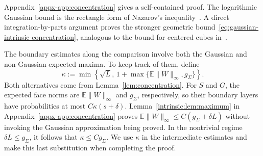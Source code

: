 \documentclass[11pt,letterpaper,twoside,leqno]{article}
\theoremstyle{bookplain}
\theoremstyle{bookremark}
\newcommand{\E}{\mathbb E}
\begin{document}
{
Appendix~\ref{appx-app:concentration} gives a self-contained proof.
The logarithmic Gaussian bound is the rectangle form of Nazarov's
inequality~\cite[Lemma~A.1]{CCK2017}. A direct integration-by-parts
argument proves the stronger geometric
bound~\eqref{eq:gaussian-intrinsic-concentration}, analogous to the
bound for centered cubes in~\cite[Theorem~3 and Comment~5]{CCK2015AC}.
}

{
The boundary estimates along the comparison involve both the Gaussian
and non-Gaussian expected maxima. To keep track of them, define
\begin{equation}\label{eq:intrinsic-boundary-coefficient}
 \kappa:=\min\left\{\sqrt L,\,
             1+\max\{\E\|W\|_\infty,g_\Sigma\}\right\}.
\end{equation}
Both alternatives come from Lemma~\ref{lem:concentration}.
For \(S\) and \(G\), the expected face norms are
\(\E\|W\|_\infty\) and \(g_\Sigma\), respectively, so their
boundary layers have probabilities at most \(C\kappa(s+\delta)\).
Lemma~\ref{intrinsic:lem:maximum} in
Appendix~\ref{appx-app:concentration} proves
\(\E\|W\|_\infty\le C(g_\Sigma+\delta L)\) without invoking
the Gaussian approximation being proved. In the nontrivial regime
\(\delta L\le g_\Sigma\), it follows that \(\kappa\le Cg_\Sigma\).
We use \(\kappa\) in the intermediate estimates and make this last
substitution when completing the proof.
}
\end{document}
